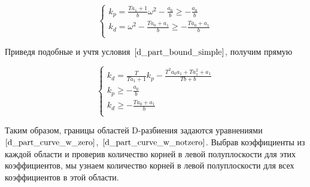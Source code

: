 \documentclass[12pt,a4paper]{article}
\begin{document}
\begin{equation}
	\label{d_part_bound_simple}
	\begin{cases}
		k_p = \frac{Ta_1+1}{b}\omega^2 -\frac{a_0}{b} \ge -\frac{a_0}{b} \\
		k_d = \omega^2 -\frac{Ta_0+a_1}{b} \ge -\frac{Ta_0+a_1}{b} \\
	\end{cases}
\end{equation}

Приведя подобные и учтя условия~$\eqref{d_part_bound_simple}$, получим прямую

\begin{equation}
	\label{d_part_curve_w_notzero}
	\begin{cases}
		k_d = \frac{T}{Ta_1+1}k_p - \frac{T^2a_0a_1 + Ta_1^2+a_1}{Tb+b} \\
		k_p \ge -\frac{a_0}{b} \\
		k_d \ge -\frac{Ta_0+a_1}{b} \\
	\end{cases}
\end{equation}

Таким образом, границы областей D-разбиения задаются уравнениями~$\eqref{d_part_curve_w_zero}$,~$\eqref{d_part_curve_w_notzero}$. Выбрав коэффициенты из каждой области и проверив количество корней в левой полуплоскости для этих коэффициентов, мы узнаем количество корней в левой полуплоскости для всех коэффициентов в этой области.




\end{document}
